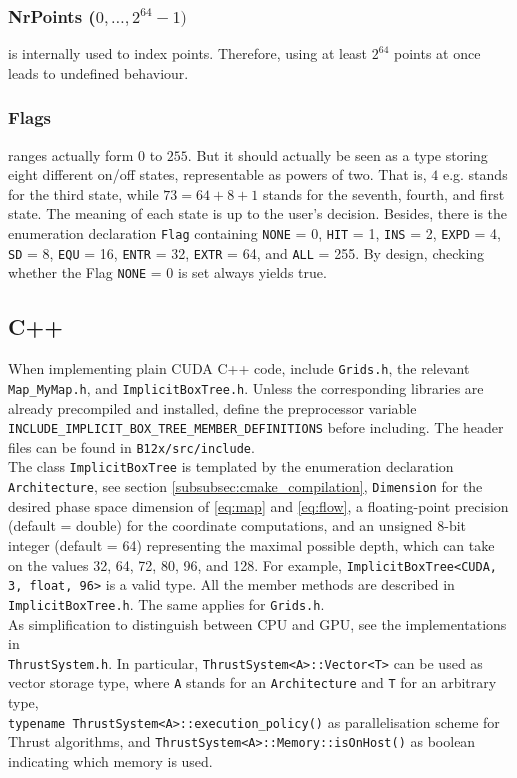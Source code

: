\documentclass[a4paper,10pt,fleqn]{article}
\begin{document}
\subsubsection*{NrPoints ($0, \ldots, 2^{64}-1)$}

is internally used to index points. Therefore, using at least $2^{64}$ points at once leads to undefined behaviour.

\subsubsection*{Flags}

ranges actually form $0$ to $255$. But it should actually be seen as a type storing eight different on/off states, representable as powers of two. That is, $4$ e.g. stands for the third state, while $73 = 64 + 8 + 1$ stands for the seventh, fourth, and first state. The meaning of each state is up to the user's decision. Besides, there is the enumeration declaration \verb$Flag$ containing \verb$NONE$ = 0, \verb$HIT$ = 1, \verb$INS$ = 2, \verb$EXPD$ = 4, \verb$SD$ = 8, \verb$EQU$ = 16, \verb$ENTR$ = 32, \verb$EXTR$ = 64, and \verb$ALL$ = 255. By design, checking whether the Flag \verb$NONE$ = 0 is set always yields true.


\subsection{C++} \label{subsec:cpp}

When implementing plain CUDA C++ code, include \verb$Grids.h$, the relevant \verb$Map_MyMap.h$, and \verb$ImplicitBoxTree.h$. Unless the corresponding libraries are already precompiled and installed, define the preprocessor variable \verb$INCLUDE_IMPLICIT_BOX_TREE_MEMBER_DEFINITIONS$ before including. The header files can be found in \verb$B12x/src/include$.\\
The class \verb$ImplicitBoxTree$ is templated by the enumeration declaration \verb$Architecture$, see section \ref{subsubsec:cmake_compilation}, \verb$Dimension$ for the desired phase space dimension of \eqref{eq:map} and \eqref{eq:flow}, a floating-point precision (default = double) for the coordinate computations, and an unsigned 8-bit integer (default = 64) representing the maximal possible depth, which can take on the values 32, 64, 72, 80, 96, and 128. For example, \verb$ImplicitBoxTree<CUDA, 3, float, 96>$ is a valid type. All the member methods are described in \verb$ImplicitBoxTree.h$. The same applies for \verb$Grids.h$.\\
As simplification to distinguish between CPU and GPU, see the implementations in\\ \verb$ThrustSystem.h$. In particular, \verb$ThrustSystem<A>::Vector<T>$ can be used as vector storage type, where \verb$A$ stands for an \verb$Architecture$ and \verb$T$ for an arbitrary type,\\
\verb$typename ThrustSystem<A>::execution_policy()$ as parallelisation scheme for Thrust algorithms, and \verb$ThrustSystem<A>::Memory::isOnHost()$ as boolean indicating which memory is used.
\end{document}
